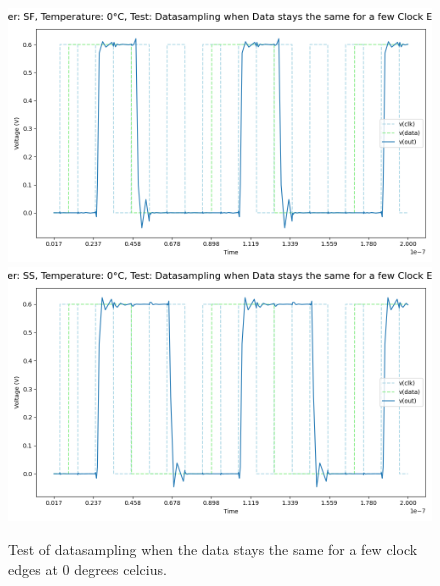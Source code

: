 \begin{figure}[H]
    \vspace{5pt}
    \includegraphics[height= 0.21\textheight]{figures/aimspice/SF/0/W3.csv.png}
    \vspace{5pt}
    \includegraphics[height= 0.21\textheight]{figures/aimspice/SS/0/W3.csv.png}
    \caption{Test of datasampling when the data stays the same for a few clock edges at 0 degrees celcius.}
    \label{fig:aimspice_W3_0}
\end{figure}

\pagebreak

